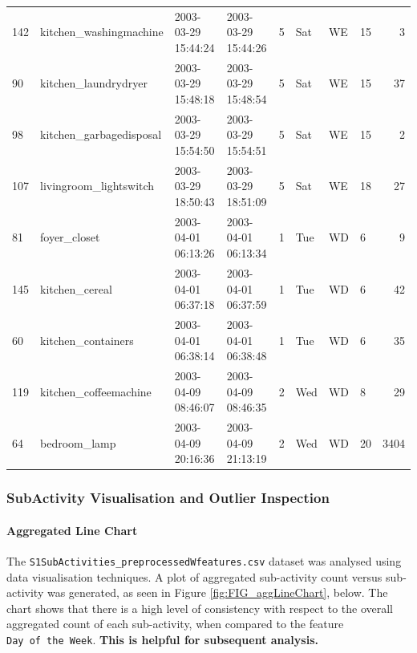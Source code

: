 \documentclass[11pt,]{article}
\let\oldparagraph\paragraph
\renewcommand{\paragraph}[1]{\oldparagraph{#1}\mbox{}}
\begin{document}
\begin{table}[!h]
{\begin{tabular}[t]{>{}l>{}lllllllr}
\rowcolor[HTML]{EACBF2}  142 & kitchen\_washingmachine & 2003-03-29 15:44:24 & 2003-03-29 15:44:26 & 5 & Sat & WE & 15 & 3\\
\addlinespace
\rowcolor[HTML]{EACBF2}  90 & kitchen\_laundrydryer & 2003-03-29 15:48:18 & 2003-03-29 15:48:54 & 5 & Sat & WE & 15 & 37\\
\rowcolor[HTML]{EACBF2}  98 & kitchen\_garbagedisposal & 2003-03-29 15:54:50 & 2003-03-29 15:54:51 & 5 & Sat & WE & 15 & 2\\
\rowcolor[HTML]{C6CDF2}  107 & livingroom\_lightswitch & 2003-03-29 18:50:43 & 2003-03-29 18:51:09 & 5 & Sat & WE & 18 & 27\\
\rowcolor[HTML]{CEF5E7}  81 & foyer\_closet & 2003-04-01 06:13:26 & 2003-04-01 06:13:34 & 1 & Tue & WD & 6 & 9\\
\rowcolor[HTML]{CEF5E7}  145 & kitchen\_cereal & 2003-04-01 06:37:18 & 2003-04-01 06:37:59 & 1 & Tue & WD & 6 & 42\\
\addlinespace
\rowcolor[HTML]{CEF5E7}  60 & kitchen\_containers & 2003-04-01 06:38:14 & 2003-04-01 06:38:48 & 1 & Tue & WD & 6 & 35\\
\rowcolor[HTML]{EACBF2}  119 & kitchen\_coffeemachine & 2003-04-09 08:46:07 & 2003-04-09 08:46:35 & 2 & Wed & WD & 8 & 29\\
\rowcolor[HTML]{CEF5E7}  64 & bedroom\_lamp & 2003-04-09 20:16:36 & 2003-04-09 21:13:19 & 2 & Wed & WD & 20 & 3404\\
\bottomrule
\end{tabular}}
\end{table}

\pagebreak

\hypertarget{subactivity-visualisation-and-outlier-inspection}{%
\subsubsection{SubActivity Visualisation and Outlier
Inspection}\label{subactivity-visualisation-and-outlier-inspection}}

\hypertarget{aggregated-line-chart}{%
\paragraph{Aggregated Line Chart}\label{aggregated-line-chart}}

The \texttt{S1SubActivities\_preprocessedWfeatures.csv} dataset was
analysed using data visualisation techniques. A plot of aggregated
sub-activity count versus sub-activity was generated, as seen in Figure
\ref{fig:FIG_aggLineChart}, below. The chart shows that there is a high
level of consistency with respect to the overall aggregated count of
each sub-activity, when compared to the feature
\texttt{Day\ of\ the\ Week}. \textbf{This is helpful for subsequent
analysis.}
\end{document}
